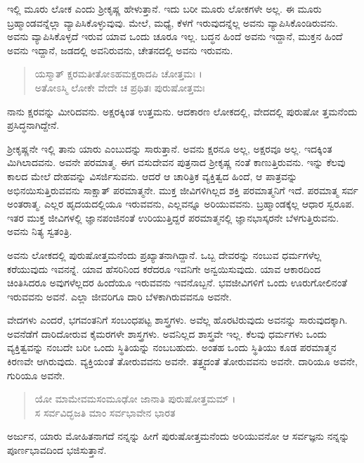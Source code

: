 ಇಲ್ಲಿ ಮೂರು ಲೋಕ ಎಂದು ಶ್ರೀಕೃಷ್ಣ ಹೇಳುತ್ತಾನೆ. ಇದು ಬರೀ ಮೂರು ಲೋಕಗಳೇ ಅಲ್ಲ. ಈ ಮೂರು ಬ್ರಹ್ಮಾಂಡವನ್ನೆಲ್ಲಾ ವ್ಯಾಪಿಸಿಕೊಳ್ಳುವುವು. ಮೇಲೆ, ಮಧ್ಯೆ, ಕೆಳಗೆ ಇರುವುದನ್ನೆಲ್ಲ ಅವನು ವ್ಯಾಪಿಸಿಕೊಂಡಿರುವನು. ಅವನು ವ್ಯಾಪಿಸಿಕೊಳ್ಳದೆ ಇರುವ ಯಾವ ಒಂದು ಚೂರೂ ಇಲ್ಲ. ಬದ್ಧನ ಹಿಂದೆ ಅವನು ಇದ್ದಾನೆ, ಮುಕ್ತನ ಹಿಂದೆ ಅವನು ಇದ್ದಾನೆ, ಜಡದಲ್ಲಿ ಅವನಿರುವನು, ಚೇತನದಲ್ಲಿ ಅವನು ಇರುವನು.

\begin{verse}
ಯಸ್ಮಾತ್ ಕ್ಷರಮತೀತೋಽಹಮಕ್ಷರಾದಪಿ ಚೋತ್ತಮಃ ।\\ಅತೋಽಸ್ಮಿ ಲೋಕೇ ವೇದೇ ಚ ಪ್ರಥಿತಃ ಪುರುಷೋತ್ತಮಃ 
\end{verse}

{\small ನಾನು ಕ್ಷರವನ್ನು ಮೀರಿದವನು. ಅಕ್ಷರಕ್ಕಿಂತ ಉತ್ತಮನು. ಆದಕಾರಣ ಲೋಕದಲ್ಲಿ, ವೇದದಲ್ಲಿ ಪುರುಷೋ ತ್ತಮನೆಂದು ಪ್ರಸಿದ್ಧನಾಗಿದ್ದೇನೆ.}

ಶ್ರೀಕೃಷ್ಣನೇ ಇಲ್ಲಿ ತಾನು ಯಾರು ಎಂಬುದನ್ನು ಸಾರುತ್ತಾನೆ. ಅವನು ಕ್ಷರನೂ ಅಲ್ಲ, ಅಕ್ಷರವೂ ಅಲ್ಲ. ಇದಕ್ಕಿಂತ ಮಿಗಿಲಾದವನು. ಅವನೇ ಪರಮಾತ್ಮ. ಈಗ ವಸುದೇವನ ಪುತ್ರನಾದ ಶ್ರೀಕೃಷ್ಣ ನಂತೆ ಕಾಣುತ್ತಿರುವನು. ಇನ್ನು ಕೆಲವು ಕಾಲದ ಮೇಲೆ ದೇಹವನ್ನು ವಿಸರ್ಜಿಸುವನು. ಆದರೆ ಆ ಚಾರಿತ್ರಿಕ ವ್ಯಕ್ತಿತ್ವದ ಹಿಂದೆ, ಆ ಪಾತ್ರವನ್ನು ಅಭಿನಯಿಸುತ್ತಿರುವವನು ಸಾಕ್ಷಾತ್ ಪರಮಾತ್ಮನೇ. ಮುಕ್ತ ಜೀವಿಗಳಿಗಿಲ್ಲದ ಶಕ್ತಿ ಪರಮಾತ್ಮನಿಗೆ ಇದೆ. ಪರಮಾತ್ಮ ಸರ್ವ ಅಂತರಾತ್ಮ. ಎಲ್ಲರ ಹೃದಯದಲ್ಲಿಯೂ ಇರುವವನು, ಎಲ್ಲವನ್ನೂ ಅರಿಯುವವನು. ಬ್ರಹ್ಮಾಂಡಕ್ಕೆಲ್ಲ ಆಧಾರ ಸ್ವರೂಪ. ಇತರ ಮುಕ್ತ ಜೀವಿಗಳಲ್ಲಿ ಜ್ಞಾನಪಂಜಿನಂತೆ ಉರಿಯುತ್ತಿದ್ದರೆ ಪರಮಾತ್ಮನಲ್ಲಿ ಜ್ಞಾನಭಾಸ್ಕರನೇ ಬೆಳಗುತ್ತಿರುವನು. ಅವನು ನಿತ್ಯ ಸ್ವತಂತ್ರಿ.

ಅವನು ಲೋಕದಲ್ಲಿ ಪುರುಷೋತ್ತಮನೆಂದು ಪ್ರಖ್ಯಾತನಾಗಿದ್ದಾನೆ. ಒಬ್ಬ ದೇವರನ್ನು ನಂಬುವ ಧರ್ಮಗಳೆಲ್ಲ ಕರೆಯುವುದು ಇವನನ್ನೆ. ಯಾವ ಹೆಸರಿನಿಂದ ಕರೆದರೂ ಇವನಿಗೇ ಅನ್ವಯಿಸುವುದು. ಯಾವ ಆಕಾರದಿಂದ ಚಿಂತಿಸಿದರೂ ಅವುಗಳೆಲ್ಲದರ ಹಿಂದೆಯೂ ಇರುವವನು ಇವನೊಬ್ಬನೆ. ಭವಜೀವಿಗಳಿಗೆ ಒಂದು ಊರುಗೋಲಿನಂತೆ ಇರುವವನು ಅವನೆ. ಎಲ್ಲಾ ಜೀವರಿಗೂ ದಾರಿ ಬೆಳಕಾಗಿರುವವನೂ ಅವನೇ.

ವೇದಗಳು ಎಂದರೆ, ಭಗವಂತನಿಗೆ ಸಂಬಂಧಪಟ್ಟ ಶಾಸ್ತ್ರಗಳು. ಅವೆಲ್ಲ ಹೊರಟಿರುವುದು ಅವನನ್ನು ಸಾರುವುದಕ್ಕಾಗಿ. ಅವನೆಡೆಗೆ ದಾರಿದೋರುವ ಕೈಮರಗಳೇ ಶಾಸ್ತ್ರಗಳು. ಅವನಿಲ್ಲದ ಶಾಸ್ತ್ರವೇ ಇಲ್ಲ. ಕೆಲವು ಧರ್ಮಗಳು ಒಂದು ವ್ಯಕ್ತಿತ್ವವನ್ನು ನಂಬದೇ ಬರೀ ಒಂದು ಸ್ಥಿತಿಯನ್ನು ನಂಬಬಹುದು. ಅಂತಹ ಒಂದು ಸ್ಥಿತಿಯು ಕೂಡ ಪರಮಾತ್ಮನ ಕಿರಣವೇ ಆಗಿರುವುದು. ವ್ಯಕ್ತಿಯಂತೆ ತೋರುವವನು ಅವನೇ. ತತ್ತ್ವದಂತೆ ತೋರುವವನು ಅವನೇ. ದಾರಿಯೂ ಅವನೇ, ಗುರಿಯೂ ಅವನೇ.

\begin{verse}
ಯೋ ಮಾಮೇವಮಸಂಮೂಢೋ ಜಾನಾತಿ ಪುರುಷೋತ್ತಮಮ್ ।\\ಸ ಸರ್ವವಿದ್ಭಜತಿ ಮಾಂ ಸರ್ವಭಾವೇನ ಭಾರತ 
\end{verse}

{\small ಅರ್ಜುನ, ಯಾರು ಮೋಹಿತನಾಗದೆ ನನ್ನನ್ನು ಹೀಗೆ ಪುರುಷೋತ್ತಮನೆಂದು ಅರಿಯುವನೋ ಆ ಸರ್ವಜ್ಞನು ನನ್ನನ್ನು ಪೂರ್ಣಭಾವದಿಂದ ಭಜಿಸುತ್ತಾನೆ.}

